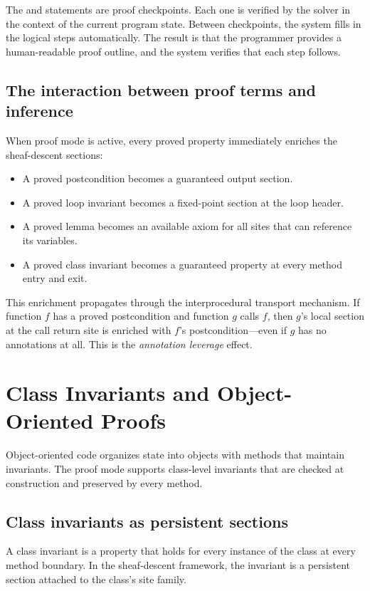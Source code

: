 \documentclass[11pt]{report}
\DeclareRobustCommand{\py}[1]{\texttt{\detokenize{#1}}}
\theoremstyle{definition}
\theoremstyle{plain}
\begin{document}
The \py{have} and \py{hence} statements are proof checkpoints. Each one is
verified by the solver in the context of the current program state. Between
checkpoints, the system fills in the logical steps automatically. The result
is that the programmer provides a human-readable proof outline, and the
system verifies that each step follows.

\section{The interaction between proof terms and inference}

When proof mode is active, every proved property immediately enriches the
sheaf-descent sections:
\begin{itemize}[nosep]
  \item A proved postcondition becomes a guaranteed output section.
  \item A proved loop invariant becomes a fixed-point section at the loop
        header.
  \item A proved lemma becomes an available axiom for all sites that can
        reference its variables.
  \item A proved class invariant becomes a guaranteed property at every
        method entry and exit.
\end{itemize}

This enrichment propagates through the interprocedural transport mechanism.
If function $f$ has a proved postcondition and function $g$ calls $f$, then
$g$'s local section at the call return site is enriched with $f$'s
postcondition---even if $g$ has no annotations at all. This is the
\emph{annotation leverage} effect.


\chapter{Class Invariants and Object-Oriented Proofs}

Object-oriented code organizes state into objects with methods that maintain
invariants. The proof mode supports class-level invariants that are checked
at construction and preserved by every method.

\section{Class invariants as persistent sections}

A class invariant is a property that holds for every instance of the class
at every method boundary. In the sheaf-descent framework, the invariant is
a persistent section attached to the class's site family.
\end{document}

